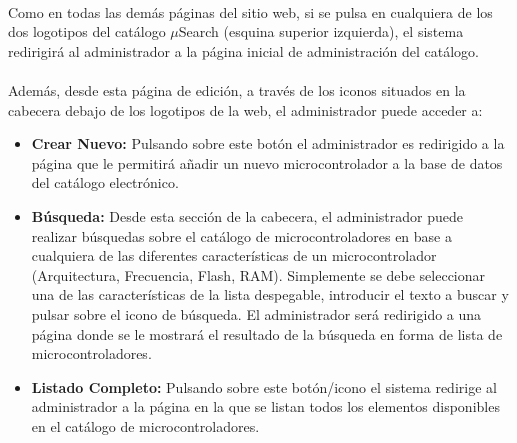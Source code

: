 \paragraph{}Como en todas las demás páginas del sitio web, si se pulsa en cualquiera de los dos logotipos del catálogo $\mu$Search (esquina superior izquierda), el sistema redirigirá al administrador a la página inicial de administración del catálogo.

\paragraph{}Además, desde esta página de edición, a través de los iconos situados en la cabecera debajo de los logotipos de la web, el administrador puede acceder a:

\begin{itemize}
	\item \textbf{Crear Nuevo:} Pulsando sobre este botón el administrador es redirigido a la página que le permitirá añadir un nuevo microcontrolador a la base de datos del catálogo electrónico.

	\item \textbf{Búsqueda:} Desde esta sección de la cabecera, el administrador puede realizar búsquedas sobre el catálogo de microcontroladores en base a cualquiera de las diferentes características de un microcontrolador (Arquitectura, Frecuencia, Flash, RAM). Simplemente se debe seleccionar una de las características de la lista despegable, introducir el texto a buscar y pulsar sobre el icono de búsqueda.
	El administrador será redirigido a una página donde se le mostrará el resultado de la búsqueda en forma de lista de microcontroladores.
			
	\item \textbf{Listado Completo:} Pulsando sobre este botón/icono el sistema redirige al administrador a la página en la que se listan todos los elementos disponibles en el catálogo de microcontroladores.
\end{itemize}